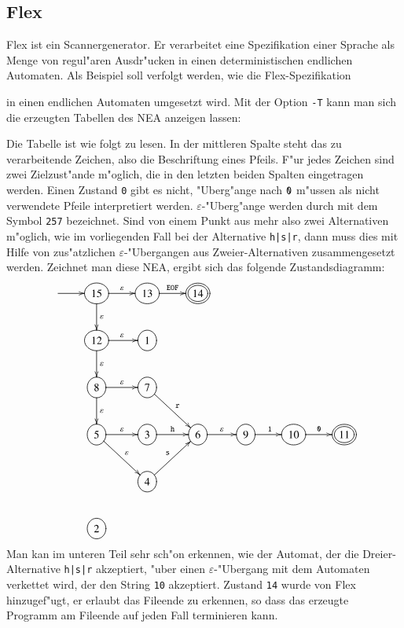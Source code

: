 \subsection{Flex}
Flex ist ein Scannergenerator. Er verarbeitet eine Spezifikation einer
Sprache als Menge von regul"aren Ausdr"ucken in einen deterministischen 
endlichen Automaten. Als Beispiel soll verfolgt werden, wie die
Flex-Spezifikation

in einen endlichen Automaten umgesetzt wird. Mit der Option {\tt -T}
kann man sich die erzeugten Tabellen des NEA anzeigen lassen:

Die Tabelle ist wie folgt zu lesen.
In der mittleren Spalte steht das zu verarbeitende Zeichen, also
die Beschriftung eines Pfeils. F"ur jedes Zeichen sind zwei Zielzust"ande
m"oglich, die in den letzten beiden Spalten eingetragen werden. Einen
Zustand {\tt 0} gibt es nicht, "Uberg"ange nach ${\tt 0}$ m"ussen als
nicht verwendete Pfeile interpretiert werden. $\varepsilon$-"Uberg"ange
werden durch mit dem Symbol {\tt 257} bezeichnet. Sind von einem Punkt
aus mehr also zwei Alternativen m"oglich, wie im vorliegenden Fall
bei der Alternative {\tt h|s|r}, dann muss dies mit Hilfe von zus"atzlichen
$\varepsilon$-"Ubergangen aus Zweier-Alternativen zusammengesetzt werden.
Zeichnet man diese NEA, ergibt sich das folgende Zustandsdiagramm:
\[
\entrymodifiers={++[o][F]}
\xymatrix{
*+\txt{}\ar[r]
	&{15} \ar[r]^{\varepsilon} \ar[d]^{\varepsilon}
		&{13}\ar[r]^{{\tt EOF}}
			&*++[o][F=]{14}
\\
*+\txt{}
	&{12}\ar[d]^{\varepsilon} \ar[r]^{\varepsilon}
		&{1}
\\
*+\txt{}
	&{8}\ar[d]^{\varepsilon} \ar[r]^{\varepsilon}
		&{7}\ar[dr]^{\tt r}
\\
*+\txt{}
	&{5}\ar[dr]^{\varepsilon} \ar[r]^{\varepsilon}
		&{3}\ar[r]^{\tt h}
			&{6}\ar[r]^{\varepsilon}
				&{9}\ar[r]^{\tt 1}
					&{10}\ar[r]^{\tt 0}
						&*++[o][F=]{11}
\\
*+\txt{}
	&*+\txt{}
		&{4}\ar[ur]^{\tt s}
\\
*+\txt{}
	&{2}
}
\]
Man kan im unteren Teil sehr sch"on erkennen, wie der Automat, der
die Dreier-Alternative {\tt h|s|r} akzeptiert, "uber einen
$\varepsilon$-"Ubergang mit dem Automaten verkettet wird, der 
den String {\tt 10} akzeptiert. Zustand {\tt 14} wurde von Flex
hinzugef"ugt, er erlaubt das Fileende zu erkennen, so dass das
erzeugte Programm am Fileende auf jeden Fall terminieren kann.

